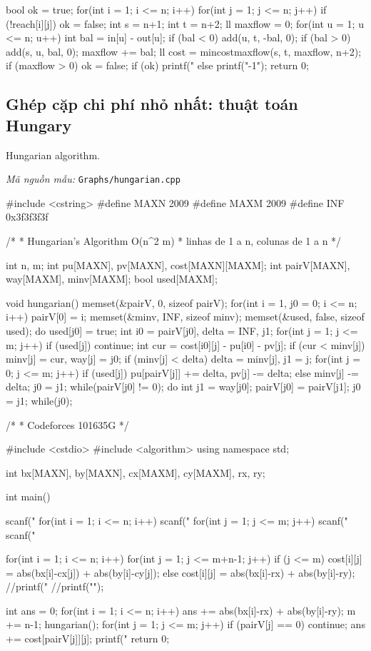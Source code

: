 \documentclass[11pt]{article}
\newcommand{\codepath}[1]{\par\noindent\textit{Mã nguồn mẫu:} \texttt{#1}\par}
\begin{document}
\begin{vncode}
{{		bool ok = true;
		for(int i = 1; i <= n; i++) {
			for(int j = 1; j <= n; j++) {
				if (!reach[i][j]) ok = false;
			}
		}
		int s = n+1;
		int t = n+2;
		ll maxflow = 0;
		for(int u = 1; u <= n; u++) {
			int bal = in[u] - out[u];
			if (bal < 0) {
				add(u, t, -bal, 0);
			}
			if (bal > 0) {
				add(s, u, bal, 0);
				maxflow += bal;
			}
		}
		ll cost = mincostmaxflow(s, t, maxflow, n+2);
		if (maxflow > 0) ok = false;
		if (ok) printf("%
		else printf("-1\n");
	}
	return 0;
}
\end{vncode}
\endgroup


\subsection{Ghép cặp chi phí nhỏ nhất: thuật toán Hungary}

Hungarian algorithm.

\codepath{Graphs/hungarian.cpp}

\begingroup\scriptsize
\begin{vncode}
#include <cstring>
#define MAXN 2009
#define MAXM 2009
#define INF 0x3f3f3f3f

/*
 * Hungarian's Algorithm O(n^2 m)
 * linhas de 1 a n, colunas de 1 a n
 */

int n, m;
int pu[MAXN], pv[MAXN], cost[MAXN][MAXM];
int pairV[MAXN], way[MAXM], minv[MAXM];
bool used[MAXM];

void hungarian() {
	memset(&pairV, 0, sizeof pairV);
	for(int i = 1, j0 = 0; i <= n; i++) {
		pairV[0] = i;
		memset(&minv, INF, sizeof minv);
		memset(&used, false, sizeof used);
		do {
			used[j0] = true;
			int i0 = pairV[j0], delta = INF, j1;
			for(int j = 1; j <= m; j++) {
				if (used[j]) continue;
				int cur = cost[i0][j] - pu[i0] - pv[j];
				if (cur < minv[j])
					minv[j] = cur, way[j] = j0;
				if (minv[j] < delta)
					delta = minv[j], j1 = j;
			}
			for(int j = 0; j <= m; j++) {
				if (used[j])
					pu[pairV[j]] += delta, pv[j] -= delta;
				else minv[j] -= delta;
			}
			j0 = j1;
		} while(pairV[j0] != 0);
		do {
			int j1 = way[j0];
			pairV[j0] = pairV[j1];
			j0 = j1;
		} while(j0);
	}
}

/*
 * Codeforces 101635G
 */

#include <cstdio>
#include <algorithm>
using namespace std;

int bx[MAXN], by[MAXN], cx[MAXM], cy[MAXM], rx, ry;

int main() {
	scanf("%
	for(int i = 1; i <= n; i++) {
		scanf("%
	}
	for(int j = 1; j <= m; j++) {
		scanf("%
	}
	scanf("%

	for(int i = 1; i <= n; i++) {
		for(int j = 1; j <= m+n-1; j++) {
			if (j <= m) cost[i][j] = abs(bx[i]-cx[j]) + abs(by[i]-cy[j]);
			else cost[i][j] = abs(bx[i]-rx) + abs(by[i]-ry);
			//printf("%
		}
		//printf("\n");
	}

	int ans = 0;
	for(int i = 1; i <= n; i++) {
		ans += abs(bx[i]-rx) + abs(by[i]-ry);
	}
	m += n-1;
	hungarian();
	for(int j = 1; j <= m; j++) {
		if (pairV[j] == 0) continue;
		ans += cost[pairV[j]][j];
	}
	printf("%
	return 0;
}
\end{vncode}
\endgroup
\end{document}
